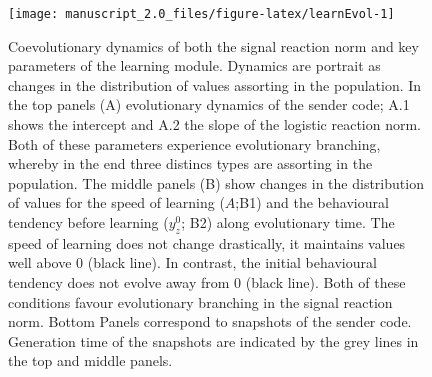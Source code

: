 \documentclass[
  12pt,
]{article}
\providecommand{\DIFaddbeginFL}{} %
\providecommand{\DIFaddendFL}{} %
\providecommand{\DIFdelbeginFL}{} %
\providecommand{\DIFdelendFL}{} %
\newcommand{\DIFscaledelfig}{0.5}
\newlength{\DIFdelgraphicswidth} %
\newlength{\DIFdelgraphicsheight} %
\newcommand{\DIFaddincludegraphics}[2][]{{\color{blue}\fbox{\DIFOincludegraphics[#1]{#2}}}} %
\newcommand{\DIFdelincludegraphics}[2][]{%
\sbox{\DIFdelgraphicsbox}{\DIFOincludegraphics[#1]{#2}}%
\settoboxwidth{\DIFdelgraphicswidth}{\DIFdelgraphicsbox} %
\settoboxtotalheight{\DIFdelgraphicsheight}{\DIFdelgraphicsbox} %
\scalebox{\DIFscaledelfig}{%
\parbox[b]{\DIFdelgraphicswidth}{\usebox{\DIFdelgraphicsbox}\\[-\baselineskip] \rule{\DIFdelgraphicswidth}{0em}}\llap{\resizebox{\DIFdelgraphicswidth}{\DIFdelgraphicsheight}{%
\setlength{\unitlength}{\DIFdelgraphicswidth}%
\begin{picture}(1,1)%
\thicklines\linethickness{2pt} %
{\color[rgb]{1,0,0}\put(0,0){\framebox(1,1){}}}%
{\color[rgb]{1,0,0}\put(0,0){\line( 1,1){1}}}%
{\color[rgb]{1,0,0}\put(0,1){\line(1,-1){1}}}%
\end{picture}%
}\hspace*{3pt}}} %
} %
\DeclareRobustCommand{\DIFaddbeginFL}{\DIFOaddbeginFL \let\includegraphics\DIFaddincludegraphics} %
\DeclareRobustCommand{\DIFaddendFL}{\DIFOaddendFL \let\includegraphics\DIFOincludegraphics} %
\DeclareRobustCommand{\DIFdelbeginFL}{\DIFOdelbeginFL \let\includegraphics\DIFdelincludegraphics} %
\DeclareRobustCommand{\DIFdelendFL}{\DIFOaddendFL \let\includegraphics\DIFOincludegraphics} %
\begin{document}
\begin{figure}

{\centering \DIFdelbeginFL %
\DIFdelendFL \DIFaddbeginFL \texttt{[image: manuscript\_2.0\_files/figure-latex/learnEvol-1]} 

\DIFaddendFL 

}

\caption{Coevolutionary dynamics of both the signal reaction norm and key parameters of the learning module. Dynamics are portrait as changes in the distribution of values assorting in the population. In the top panels (A)  evolutionary dynamics of the sender code; A.1 shows the intercept and A.2 the slope of the logistic reaction norm. Both of these parameters experience evolutionary branching, whereby in the end three distincs types are assorting in the population. The middle panels (B) show changes in the distribution of values for the speed of learning ($A$;B1) and the behavioural tendency before learning ($y_z^0$; B2) along evolutionary time. The speed of learning does not change drastically, it maintains values well above 0 (black line). In contrast, the initial behavioural tendency does not evolve away from 0 (black line). Both of these conditions favour evolutionary branching in the signal reaction norm. Bottom Panels correspond to snapshots of the sender code. Generation time of the snapshots are indicated by the grey lines in the top and middle panels.}\label{fig:learnEvol}
\end{figure}

\newpage
\small
\end{document}
